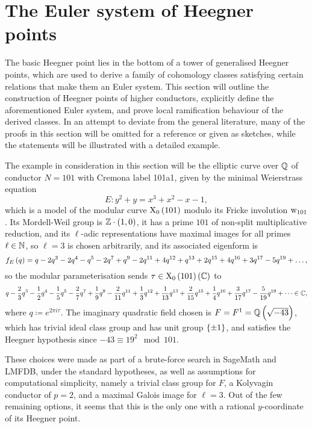 \pagebreak

\section{The Euler system of Heegner points}

The basic Heegner point lies in the bottom of a tower of generalised Heegner points, which are used to derive a family of cohomology classes satisfying certain relations that make them an Euler system. This section will outline the construction of Heegner points of higher conductors, explicitly define the aforementioned Euler system, and prove local ramification behaviour of the derived classes. In an attempt to deviate from the general literature, many of the proofs in this section will be omitted for a reference or given as sketches, while the statements will be illustrated with a detailed example.

\begin{example}
The example in consideration in this section will be the elliptic curve over $ \mathbb{Q} $ of conductor $ N = 101 $ with Cremona label 101a1, given by the minimal Weierstrass equation
$$ E : y^2 + y = x^3 + x^2 - x - 1, $$
which is a model of the modular curve $ \X_0\br{101} $ modulo its Fricke involution $ \mathrm{w}_{101} $. Its Mordell-Weil group is $ \ZZ \cdot \br{1, 0} $, it has a prime $ 101 $ of non-split multiplicative reduction, and its $ \ell $-adic representations have maximal images for all primes $ \ell \in \mathbb{N} $, so $ \ell = 3 $ is chosen arbitrarily, and its associated eigenform is
$$ f_E\br{q} = q - 2q^3 - 2q^4 - q^5 - 2q^7 + q^9 - 2q^{11} + 4q^{12} + q^{13} + 2q^{15} + 4q^{16} + 3q^{17} - 5q^{19} + \dots, $$
so the modular parameterisation sends $ \tau \in \X_0\br{101}\br{\CC} $ to
$$ q - \dfrac{2}{3}q^3 - \dfrac{1}{2}q^4 - \dfrac{1}{5}q^5 - \dfrac{2}{7}q^7 + \dfrac{1}{9}q^9 - \dfrac{2}{11}q^{11} + \dfrac{1}{3}q^{12} + \dfrac{1}{13}q^{13} + \dfrac{2}{15}q^{15} + \dfrac{1}{4}q^{16} + \dfrac{3}{17}q^{17} - \dfrac{5}{19}q^{19} + \dots \in \mathbb{C}, $$
where $ q \coloneqq e^{2\pi i\tau} $. The imaginary quadratic field chosen is $ F = F^1 = \QQ\br{\sqrt{-43}} $, which has trivial ideal class group and has unit group $ \cbr{\pm 1} $, and satisfies the Heegner hypothesis since $ -43 \equiv 19^2 \mod 101 $.
\end{example}

\begin{remark}
These choices were made as part of a brute-force search in SageMath and LMFDB, under the standard hypotheses, as well as assumptions for computational simplicity, namely a trivial class group for $ F $, a Kolyvagin conductor of $ p = 2 $, and a maximal Galois image for $ \ell = 3 $. Out of the few remaining options, it seems that this is the only one with a rational $ y $-coordinate of its Heegner point.
\end{remark}

